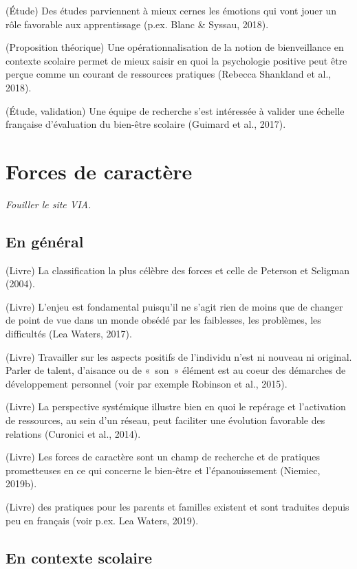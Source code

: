\documentclass[
  french,
]{article}
\begin{document}
(Étude) Des études parviennent à mieux cernes les émotions qui vont jouer un rôle favorable aux apprentissage (p.ex. Blanc \& Syssau, 2018).

(Proposition théorique) Une opérationnalisation de la notion de bienveillance en contexte scolaire permet de mieux saisir en quoi la psychologie positive peut être perçue comme un courant de ressources pratiques (Rebecca Shankland et al., 2018).

(Étude, validation) Une équipe de recherche s'est intéressée à valider une échelle française d'évaluation du bien-être scolaire (Guimard et al., 2017).

\hypertarget{forces-de-caractuxe8re}{%
\section{Forces de caractère}\label{forces-de-caractuxe8re}}

\emph{Fouiller le site VIA.}

\hypertarget{en-guxe9nuxe9ral}{%
\subsection{En général}\label{en-guxe9nuxe9ral}}

(Livre) La classification la plus célèbre des forces et celle de Peterson et Seligman (2004).

(Livre) L'enjeu est fondamental puisqu'il ne s'agit rien de moins que de changer de point de vue dans un monde obsédé par les faiblesses, les problèmes, les difficultés (Lea Waters, 2017).

(Livre) Travailler sur les aspects positifs de l'individu n'est ni nouveau ni original. Parler de talent, d'aisance ou de «~son~» élément est au coeur des démarches de développement personnel (voir par exemple Robinson et al., 2015).

(Livre) La perspective systémique illustre bien en quoi le repérage et l'activation de ressources, au sein d'un réseau, peut faciliter une évolution favorable des relations (Curonici et al., 2014).

(Livre) Les forces de caractère sont un champ de recherche et de pratiques prometteuses en ce qui concerne le bien-être et l'épanouissement (Niemiec, 2019b).

(Livre) des pratiques pour les parents et familles existent et sont traduites depuis peu en français (voir p.ex. Lea Waters, 2019).

\hypertarget{en-contexte-scolaire}{%
\subsection{En contexte scolaire}\label{en-contexte-scolaire}}
\end{document}

